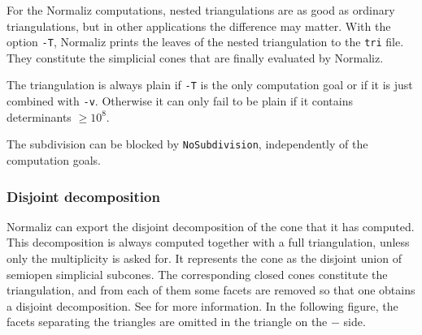 \documentclass[12pt,a4paper]{scrartcl}
\theoremstyle{definition}
\begin{document}
{For the Normaliz computations, nested triangulations are as good as ordinary triangulations, but in other applications the difference may matter. With the option \verb|-T|, Normaliz prints the leaves of the nested triangulation to the \verb|tri| file. They constitute the simplicial cones that are finally evaluated by Normaliz.

The triangulation is always plain if \verb|-T| is the only computation goal or if it is just combined with \verb|-v|. Otherwise it can only fail to be plain if it contains determinants $\ge 10^8$.

The subdivision can be blocked by \verb|NoSubdivision|, independently of the computation goals.

\subsubsection{Disjoint decomposition}\label{Disjoint}

Normaliz can export the disjoint decomposition of the cone that it has computed. This decomposition is always computed together with a full triangulation, unless only the multiplicity is asked for. It represents the cone as the disjoint union of semiopen simplicial subcones. The corresponding closed cones constitute the triangulation, and from each of them some facets are removed so that one obtains a disjoint decomposition. See \cite{BIS} for more information. In the following figure, the facets separating the triangles are omitted in the triangle on the $-$ side.

\begin{center}
	\begin{scriptsize}
\end{scriptsize}
\end{center}}
\end{document}
